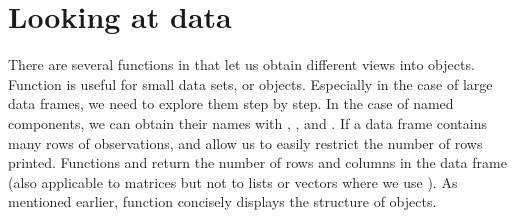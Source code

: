 \documentclass[krantz2]{krantz}\usepackage{knitr}
\begin{document}
\section{Looking at data}\label{sec:calc:looking:at:data}
There are several functions in \Rlang that let us obtain different views into objects. Function  is useful for small data sets, or objects. Especially in the case of large data frames, we need to explore them step by step. In the case of named components, we can obtain their names with , , and . If a data frame contains many rows of observations,  and  allow us to easily restrict the number of rows printed. Functions  and  return the number of rows and columns in the data frame (also applicable to matrices but not to lists or vectors where we use ). As mentioned earlier, function  concisely displays the structure of \Rlang objects.
\end{document}

